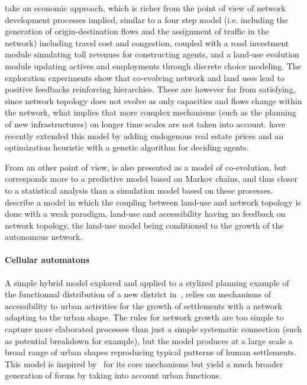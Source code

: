 \cite{levinson2007co} take an economic approach, which is richer from the point of view of network development processes implied, similar to a four step model (i.e. including the generation of origin-destination flows and the assignment of traffic in the network) including travel cost and congestion, coupled with a road investment module simulating toll revenues for constructing agents, and a land-use evolution module updating actives and employments through discrete choice modeling. The exploration experiments show that co-evolving network and land uses lead to positive feedbacks reinforcing hierarchies. These are however far from satisfying, since network topology does not evolve as only capacities and flows change within the network, what implies that more complex mechanisms (such as the planning of new infrastructures) on longer time scales are not taken into account. \cite{li2016integrated} have recently extended this model by adding endogenous real estate prices and an optimization heuristic with a genetic algorithm for deciding agents.


From an other point of view, \cite{levinson2005paving} is also presented as a model of co-evolution, but corresponds more to a predictive model based on Markov chains, and thus closer to a statistical analysis than a simulation model based on these processes. \cite{rui2011urban} describe a model in which the coupling between land-use and network topology is done with a weak paradigm, land-use and accessibility having no feedback on network topology, the land-use model being conditioned to the growth of the autonomous network.




\paragraph{Cellular automatons}


A simple hybrid model explored and applied to a stylized planning example of the functionnal distribution of a new district in~\cite{raimbault2014hybrid}, relies on mechanisms of accessibility to urban activities for the growth of settlements with a network adapting to the urban shape. The rules for network growth are too simple to capture more elaborated processes than just a simple systematic connection (such as potential breakdown for example), but the model produces at a large scale a broad range of urban shapes reproducing typical patterns of human settlements. This model is inspired by~\cite{moreno2012automate} for its core mechanisms but yield a much broader generation of forms by taking into account urban functions.


